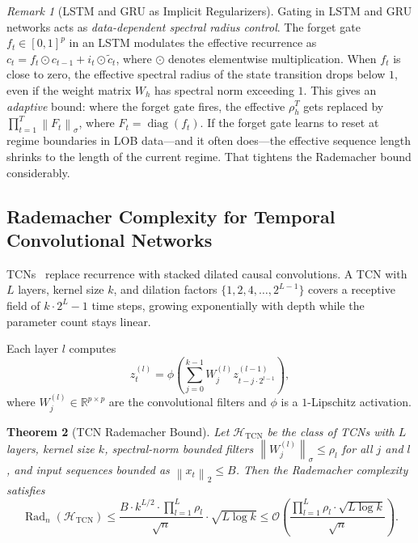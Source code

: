 \documentclass[11pt]{article}
\newtheorem{theorem}{Theorem}[section]
\theoremstyle{definition}
\theoremstyle{remark}
\newtheorem{remark}[theorem]{Remark}
\newcommand{\R}{\mathbb{R}}
\newcommand{\cH}{\mathcal{H}}
\newcommand{\cO}{\mathcal{O}}
\DeclareMathOperator{\Rad}{Rad}
\DeclareMathOperator{\diag}{diag}
\newcommand{\norm}[1]{\left\lVert #1 \right\rVert}
\begin{document}
\begin{remark}[LSTM and GRU as Implicit Regularizers]\label{rem:lstm_gru}
Gating in LSTM and GRU networks acts as \emph{data-dependent spectral radius control}.
The forget gate $f_t \in [0,1]^p$ in an LSTM modulates the effective recurrence as $c_t = f_t \odot c_{t-1} + i_t \odot \tilde{c}_t$, where $\odot$ denotes elementwise multiplication.
When $f_t$ is close to zero, the effective spectral radius of the state transition drops below $1$, even if the weight matrix $W_h$ has spectral norm exceeding $1$.
This gives an \emph{adaptive} bound: where the forget gate fires, the effective $\rho_h^T$ gets replaced by $\prod_{t=1}^T \norm{F_t}_\sigma$, where $F_t = \diag(f_t)$.
If the forget gate learns to reset at regime boundaries in LOB data---and it often does---the effective sequence length shrinks to the length of the current regime.
That tightens the Rademacher bound considerably.
\end{remark}


\subsection{Rademacher Complexity for Temporal Convolutional Networks}\label{sec:theory:tcn}

TCNs~\citep{bai2018empirical} replace recurrence with stacked dilated causal convolutions.
A TCN with $L$ layers, kernel size $k$, and dilation factors $\{1, 2, 4, \ldots, 2^{L-1}\}$ covers a receptive field of $k \cdot 2^L - 1$ time steps, growing exponentially with depth while the parameter count stays linear.

Each layer $l$ computes
\[
    z_t^{(l)} = \phi\!\left( \sum_{j=0}^{k-1} W_j^{(l)} z_{t - j \cdot 2^{l-1}}^{(l-1)} \right),
\]
where $W_j^{(l)} \in \R^{p \times p}$ are the convolutional filters and $\phi$ is a $1$-Lipschitz activation.

\begin{theorem}[TCN Rademacher Bound]\label{thm:tcn_bound}
Let $\cH_{\mathrm{TCN}}$ be the class of TCNs with $L$ layers, kernel size $k$, spectral-norm bounded filters $\norm{W_j^{(l)}}_\sigma \leq \rho_l$ for all $j$ and $l$, and input sequences bounded as $\norm{x_t}_2 \leq B$.
Then the Rademacher complexity satisfies
\[
    \Rad_n(\cH_{\mathrm{TCN}}) \leq \frac{B \cdot k^{L/2} \cdot \prod_{l=1}^L \rho_l}{\sqrt{n}} \cdot \sqrt{L \log k} \leq \cO\!\left( \frac{\prod_{l=1}^L \rho_l \cdot \sqrt{L \log k}}{\sqrt{n}} \right).
\]
\end{theorem}
\end{document}
